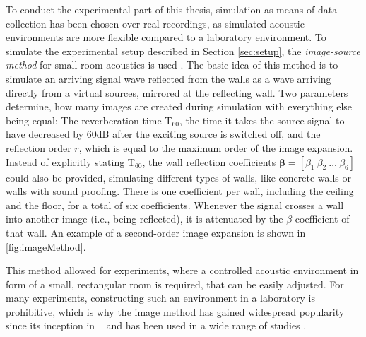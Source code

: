 To conduct the experimental part of this thesis, simulation as means of data collection has been chosen over real recordings, as simulated acoustic environments are more flexible compared to a laboratory environment. To simulate the experimental setup  described in Section \ref{sec:setup}, the \emph{image-source method} for small-room acoustics is used \cite{Allen1979}. The basic idea of this method is to simulate an arriving signal wave reflected from the walls as a wave arriving directly from a virtual sources, mirrored at the reflecting wall. Two parameters determine, how many images are created during simulation with everything else being equal: The reverberation time T$_{60}$, the time it takes the source signal to have decreased by 60dB after the exciting source is switched off, and the reflection order $r$, which is equal to the maximum order of the image expansion. Instead of explicitly stating T$_{60}$, the wall reflection coefficients $\bm\beta = [\beta_1~\beta_2~\dots~\beta_6]$ could also be provided, simulating different types of walls, like concrete walls or walls with sound proofing. There is one coefficient per wall, including the ceiling and the floor, for a total of six coefficients. Whenever the signal crosses a wall into another image (i.e., being reflected), it is attenuated by the $\beta$-coefficient of that wall. An example of a second-order image expansion is shown in \autoref{fig:imageMethod}.

This method allowed for experiments, where a controlled acoustic environment in form of a small, rectangular room is required, that can be easily adjusted. For many experiments, constructing such an environment in a laboratory is prohibitive, which is why the image method has gained widespread popularity since its inception in \citeyear{Allen1979}~\cite{Allen1979} and has been used in a wide range of studies \cite{Champagne1996}.